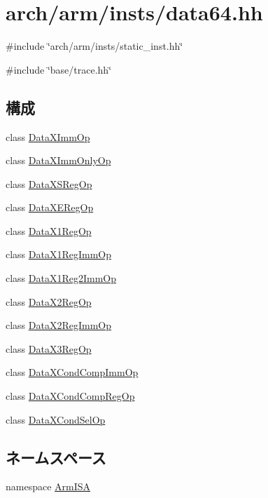 \hypertarget{data64_8hh}{
\section{arch/arm/insts/data64.hh}
\label{data64_8hh}
}
{\ttfamily \#include \char`\"{}arch/arm/insts/static\_\-inst.hh\char`\"{}}\par
{\ttfamily \#include \char`\"{}base/trace.hh\char`\"{}}\par
\subsection*{構成}
\begin{DoxyCompactItemize}
\item 
class \hyperlink{classArmISA_1_1DataXImmOp}{DataXImmOp}
\item 
class \hyperlink{classArmISA_1_1DataXImmOnlyOp}{DataXImmOnlyOp}
\item 
class \hyperlink{classArmISA_1_1DataXSRegOp}{DataXSRegOp}
\item 
class \hyperlink{classArmISA_1_1DataXERegOp}{DataXERegOp}
\item 
class \hyperlink{classArmISA_1_1DataX1RegOp}{DataX1RegOp}
\item 
class \hyperlink{classArmISA_1_1DataX1RegImmOp}{DataX1RegImmOp}
\item 
class \hyperlink{classArmISA_1_1DataX1Reg2ImmOp}{DataX1Reg2ImmOp}
\item 
class \hyperlink{classArmISA_1_1DataX2RegOp}{DataX2RegOp}
\item 
class \hyperlink{classArmISA_1_1DataX2RegImmOp}{DataX2RegImmOp}
\item 
class \hyperlink{classArmISA_1_1DataX3RegOp}{DataX3RegOp}
\item 
class \hyperlink{classArmISA_1_1DataXCondCompImmOp}{DataXCondCompImmOp}
\item 
class \hyperlink{classArmISA_1_1DataXCondCompRegOp}{DataXCondCompRegOp}
\item 
class \hyperlink{classArmISA_1_1DataXCondSelOp}{DataXCondSelOp}
\end{DoxyCompactItemize}
\subsection*{ネームスペース}
\begin{DoxyCompactItemize}
\item 
namespace \hyperlink{namespaceArmISA}{ArmISA}
\end{DoxyCompactItemize}
